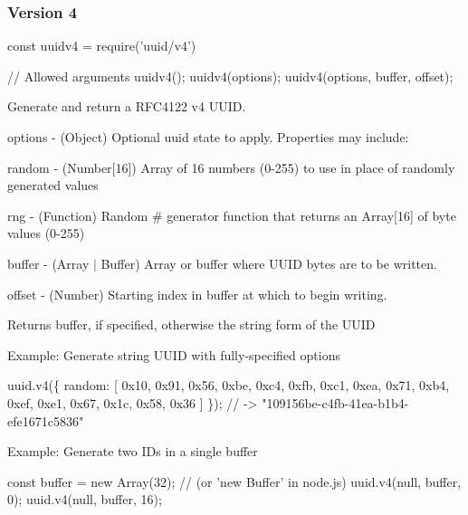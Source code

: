\subsubsection*{Version 4}


\begin{DoxyCode}
const uuidv4 = require('uuid/v4')

// Allowed arguments
uuidv4();
uuidv4(options);
uuidv4(options, buffer, offset);
\end{DoxyCode}


Generate and return a R\+F\+C4122 v4 U\+U\+ID.


\begin{DoxyItemize}
\item {\ttfamily options} -\/ (Object) Optional uuid state to apply. Properties may include\+:
\begin{DoxyItemize}
\item {\ttfamily random} -\/ (Number\mbox{[}16\mbox{]}) Array of 16 numbers (0-\/255) to use in place of randomly generated values
\item {\ttfamily rng} -\/ (Function) Random \# generator function that returns an Array\mbox{[}16\mbox{]} of byte values (0-\/255)
\end{DoxyItemize}
\item {\ttfamily buffer} -\/ (Array $\vert$ Buffer) Array or buffer where U\+U\+ID bytes are to be written.
\item {\ttfamily offset} -\/ (Number) Starting index in {\ttfamily buffer} at which to begin writing.
\end{DoxyItemize}

Returns {\ttfamily buffer}, if specified, otherwise the string form of the U\+U\+ID

Example\+: Generate string U\+U\+ID with fully-\/specified options


\begin{DoxyCode}
uuid.v4(\{
  random: [
    0x10, 0x91, 0x56, 0xbe, 0xc4, 0xfb, 0xc1, 0xea,
    0x71, 0xb4, 0xef, 0xe1, 0x67, 0x1c, 0x58, 0x36
  ]
\});
// -> "109156be-c4fb-41ea-b1b4-efe1671c5836"
\end{DoxyCode}


Example\+: Generate two I\+Ds in a single buffer


\begin{DoxyCode}
const buffer = new Array(32); // (or 'new Buffer' in node.js)
uuid.v4(null, buffer, 0);
uuid.v4(null, buffer, 16);
\end{DoxyCode}


